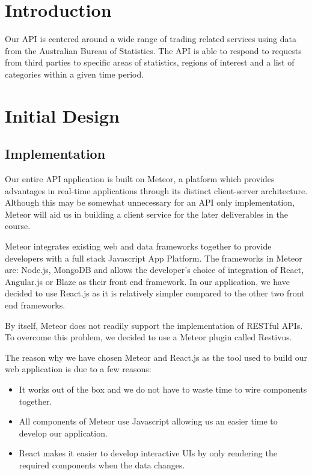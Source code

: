 \documentclass[a4paper, dvipsnames]{scrartcl}
\begin{document}
\tableofcontents
\newpage

\section{Introduction}
Our API is centered around a wide range of trading related services using data from the Australian Bureau of Statistics. The API is able to respond to requests from third parties to specific areas of statistics, regions of interest and a list of categories within a given time period.

\section{Initial Design}
\subsection{Implementation}
Our entire API application is built on Meteor, a platform which provides advantages in real-time applications through its distinct client-server architecture. Although this may be somewhat unnecessary for an API only implementation, Meteor will aid us in building a client service for the later deliverables in the course.

Meteor integrates existing web and data frameworks together to provide developers with a
full stack Javascript App Platform. The frameworks in Meteor are: Node.js, MongoDB and allows the developer's choice of integration of React, Angular.js or Blaze as their front end framework. In our application, we have decided to use React.js as it is relatively simpler compared to the other two front end frameworks.

By itself, Meteor does not readily support the implementation of RESTful APIs. To overcome this problem, we decided to use a Meteor plugin called Restivus.

The reason why we have chosen Meteor and React.js as the tool used to build our web application is due to a few reasons:

\begin{itemize}
    \item It works out of the box and we do not have to waste time to wire components together.
    \item All components of Meteor use Javascript allowing us an easier time to develop our application.
    \item React makes it easier to develop interactive UIs by only rendering the required components when the data changes.
\end{itemize}
\end{document}
